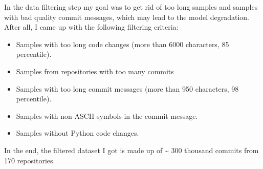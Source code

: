 In the data filtering step my goal was to get rid of too long samples and samples with bad quality commit messages, which may lead to the model degradation. After all, I came up with the following filtering criteria: 
\begin{itemize}
    \item Samples with too long code changes (more than 6000 characters, 85 percentile).
    \item Samples from repositories with too many commits
    \item Samples with too long commit messages (more than 950 characters, 98 percentile).
    \item Samples with non-ASCII symbols in the commit message.
    \item Samples without Python code changes.
\end{itemize}
In the end, the filtered dataset I got is made up of \textasciitilde{} 300 thousand commits from 170 repositories. 

